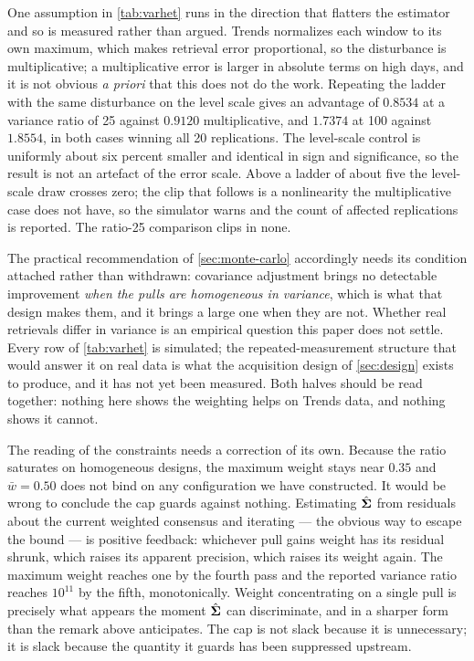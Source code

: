 \documentclass[12pt,a4paper,oneside]{article}
\begin{document}
One assumption in \cref{tab:varhet} runs in the direction that flatters the
estimator and so is measured rather than argued. Trends normalizes each window to
its own maximum, which makes retrieval error proportional, so the disturbance is
multiplicative; a multiplicative error is larger in absolute terms on high days,
and it is not obvious \emph{a priori} that this does not do the work. Repeating
the ladder with the same disturbance on the level scale gives an advantage of
$0.8534$ at a variance ratio of 25 against $0.9120$ multiplicative, and $1.7374$
at 100 against $1.8554$, in both cases winning all 20 replications. The
level-scale control is uniformly about six percent smaller and identical in sign
and significance, so the result is not an artefact of the error scale. Above a
ladder of about five the level-scale draw crosses zero; the clip that follows is a
nonlinearity the multiplicative case does not have, so the simulator warns and the
count of affected replications is reported. The ratio-25 comparison clips in none.

The practical recommendation of \cref{sec:monte-carlo} accordingly needs its
condition attached rather than withdrawn: covariance adjustment brings no
detectable improvement \emph{when the pulls are homogeneous in variance}, which is
what that design makes them, and it brings a large one when they are not. Whether
real retrievals differ in variance is an empirical question this paper does not
settle. Every row of \cref{tab:varhet} is simulated; the repeated-measurement
structure that would answer it on real data is what the acquisition design of
\cref{sec:design} exists to produce, and it has not yet been measured. Both halves
should be read together: nothing here shows the weighting helps on Trends data,
and nothing shows it cannot.

The reading of the constraints needs a correction of its own. Because the ratio
saturates on homogeneous designs,
the maximum weight stays near $0.35$ and $\bar{w}=0.50$ does not bind on any
configuration we have constructed. It would be wrong to conclude the cap guards
against nothing. Estimating $\hat{\bm{\Sigma}}$ from residuals about the current weighted
consensus and iterating --- the obvious way to escape the bound --- is positive
feedback: whichever pull gains weight has its residual shrunk, which raises its
apparent precision, which raises its weight again. The maximum weight reaches one
by the fourth pass and the reported variance ratio reaches $10^{11}$ by the fifth,
monotonically. Weight concentrating on a single pull is precisely what appears the
moment $\hat{\bm{\Sigma}}$ can discriminate, and in a sharper form than the remark above
anticipates. The cap is not slack because it is unnecessary; it is slack because
the quantity it guards has been suppressed upstream.
\end{document}
